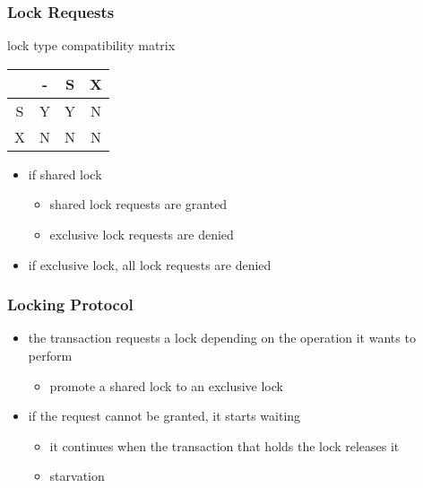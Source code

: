 \documentclass[dvipsnames]{beamer}
\theoremstyle{plain}
\begin{document}
\begin{frame}
  \frametitle{Lock Requests}

  \begin{block}{lock type compatibility matrix}
    \begin{table}
      \begin{tabular}{|c||c|c|c|}\hline
  & - & S & X\\\hline\hline
S & Y & Y & N\\\hline
X & N & N & N\\\hline
      \end{tabular}
    \end{table}
  \end{block}

  \begin{itemize}
    \item if shared lock
    \begin{itemize}
      \item shared lock requests are granted
      \item exclusive lock requests are denied
    \end{itemize}

    \item if exclusive lock, all lock requests are denied
  \end{itemize}
\end{frame}

\begin{frame}
  \frametitle{Locking Protocol}

  \begin{itemize}
    \item the transaction requests a lock depending on the operation it wants
      to perform
    \begin{itemize}
      \item promote a shared lock to an exclusive lock
    \end{itemize}

    \pause
    \item if the request cannot be granted, it starts waiting
    \begin{itemize}
      \item it continues when the transaction that holds the lock releases it
      \item \alert{starvation}
    \end{itemize}
  \end{itemize}
\end{frame}
\end{document}
